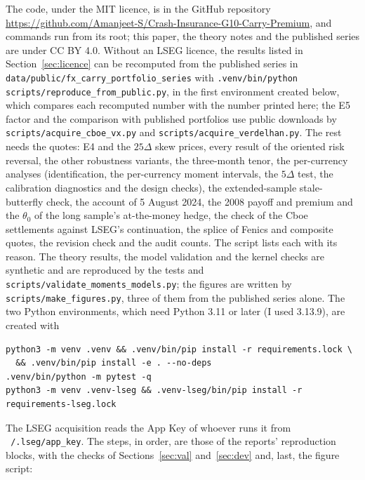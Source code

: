 \documentclass[11pt]{article}
\theoremstyle{result}
\newcommand{\D}{\Delta}
\begin{document}
The code, under the MIT licence, is in the GitHub repository \url{https://github.com/Amanjeet-S/Crash-Insurance-G10-Carry-Premium}, and commands run from its root; this paper, the theory notes and the published series are under CC BY 4.0. Without an LSEG licence, the results listed in Section~\ref{sec:licence} can be recomputed from the published series in \texttt{data/public/\allowbreak fx\_carry\_portfolio\_series} with \texttt{.venv/bin/python scripts/\allowbreak reproduce\_from\_public.py}, in the first environment created below, which compares each recomputed number with the number printed here; the E5 factor and the comparison with published portfolios use public downloads by \texttt{scripts/acquire\_cboe\_vx.py} and \texttt{scripts/acquire\_verdelhan.py}. The rest needs the quotes: E4 and the $25\D$ skew prices, every result of the oriented risk reversal, the other robustness variants, the three-month tenor, the per-currency analyses (identification, the per-currency moment intervals, the $5\D$ test, the calibration diagnostics and the design checks), the extended-sample stale-butterfly check, the account of 5 August 2024, the 2008 payoff and premium and the $\theta_0$ of the long sample's at-the-money hedge, the check of the Cboe settlements against LSEG's continuation, the splice of Fenics and composite quotes, the revision check and the audit counts. The script lists each with its reason. The theory results, the model validation and the kernel checks are synthetic and are reproduced by the tests and \texttt{scripts/\allowbreak validate\_moments\_models.py}; the figures are written by \texttt{scripts/\allowbreak make\_figures.py}, three of them from the published series alone. The two Python environments, which need Python 3.11 or later (I used 3.13.9), are created with
{\small\begin{verbatim}
python3 -m venv .venv && .venv/bin/pip install -r requirements.lock \
  && .venv/bin/pip install -e . --no-deps
.venv/bin/python -m pytest -q
python3 -m venv .venv-lseg && .venv-lseg/bin/pip install -r requirements-lseg.lock
\end{verbatim}}
The LSEG acquisition reads the App Key of whoever runs it from \texttt{\string~/.lseg/app\_key}. The steps, in order, are those of the reports' reproduction blocks, with the checks of Sections~\ref{sec:val} and~\ref{sec:dev} and, last, the figure script:
\end{document}
